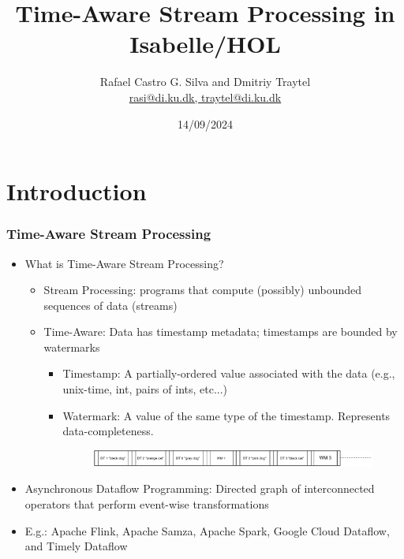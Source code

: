 \documentclass[aspectratio=169,10pt]{beamer}
\title[Time-Aware Stream Processing in Isabelle/HOL]{Time-Aware Stream Processing in Isabelle/HOL}
\author[Rafael Castro and Dmitriy Traytel]{
  Rafael Castro G. Silva and  Dmitriy Traytel\\\medskip
  {\small \url{rasi@di.ku.dk, traytel@di.ku.dk}}}
\date{14/09/2024}
\institute[UCPH]{
  Department of Computer Science \\
  University of Copenhagen}
\begin{document}

\begin{frame}
  \titlepage

\end{frame}
\section{Introduction}

\begin{frame}[fragile]
  \frametitle{Time-Aware Stream Processing}
  \begin{itemize}
    \item What is Time-Aware Stream Processing?
          \begin{itemize}
                  \pause
            \item Stream Processing: programs that compute (possibly) unbounded sequences of data (streams)
                  \pause
            \item Time-Aware: Data has timestamp metadata; timestamps are bounded by watermarks
                  \begin{itemize}
                    \item Timestamp: A partially-ordered value associated with the data (e.g., unix-time, int, pairs of ints, etc...)
                    \item Watermark: A value of the same type of the timestamp. Represents data-completeness.
                          \begin{figure}
                            \centering
                            \includegraphics[width=.75\textwidth]{stream_ex1.pdf}
                          \end{figure}
                  \end{itemize}
          \end{itemize}
          \pause
    \item Asynchronous Dataflow Programming: Directed graph of interconnected operators that perform event-wise transformations
    \item E.g.: Apache Flink, Apache Samza, Apache Spark, Google Cloud Dataflow, and Timely Dataflow
          \vspace*{-1ex}
          \begin{overlayarea}{\textwidth}{.1\textheight}
            \centering
            \begin{figure}

\end{figure}
\end{overlayarea}
\end{itemize}
\end{frame}
\end{document}
